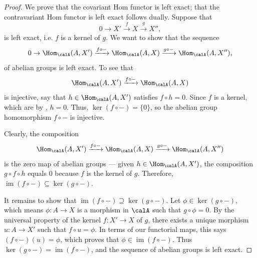 \begin{proof}
    We prove that the covariant Hom functor is left exact; that the contravariant Hom functor is left exact follows dually.  
    Suppose that 
    $$0 \to X' \xrightarrow{f} X \xrightarrow{g} X'', $$
    is left exact, i.e. $f$ is a kernel of $g$. 
    We want to show that the sequence
    $$0 \to \Hom_\calA(A, X') \xrightarrow{f \circ -} \Hom_{\calA}(A, X) \xrightarrow{g \circ -} \Hom_{\calA}(A, X''), $$
    of abelian groups is left exact. To see that 
    $$\Hom_\calA(A, X') \xrightarrow{f \circ -} \Hom_{\calA}(A, X)$$
    is injective, say that $h \in \Hom_\calA(A,X')$ satisfies $f \circ h = 0$. Since $f$ is a kernel, which are  by , $h = 0$. Thus, $\ker(f \circ -) = \{0\}$, so the abelian group homomorphism $f \circ -$ is injective.

    Clearly, the composition
    $$\Hom_\calA(A, X') \xrightarrow{f \circ -} \Hom_{\calA}(A, X) \xrightarrow{g \circ -} \Hom_{\calA}(A, X'')$$
    is the zero map of abelian groups --- given $h \in \Hom_\calA(A, X')$, the composition $g \circ f \circ h$ equals $0$ because $f$ is the kernel of $g$. Therefore, $\operatorname{im}(f \circ -) \subseteq \ker(g \circ -)$.


    It remains to show that $\operatorname{im}(f \circ -) \supseteq \ker(g \circ -)$.  Let $\phi \in \ker(g \circ -)$, which means $\phi: A \to X$ is a morphism in $\calA$ such that $g \circ \phi = 0$. By the universal property of the kernel $f: X' \to X$ of $g$, there exists a unique morphism $u: A \to X'$ such that $f \circ u = \phi$.  In terms of our functorial maps, this says $(f \circ -)(u) = \phi$, which proves that $\phi \in \operatorname{im}(f \circ -)$. Thus $\ker(g \circ -) = \operatorname{im}(f \circ -)$, and the sequence of 
    abelian groups is left exact.

\end{proof}